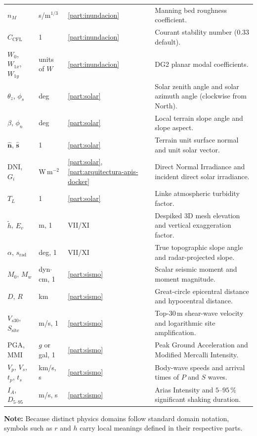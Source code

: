\documentclass[11pt,a4paper]{article}
\newcommand{\unit}[1]{\mathrm{#1}}
\begin{document}
\begin{longtable}{p{.16\linewidth}p{.11\linewidth}p{.16\linewidth}p{.45\linewidth}}
$n_M$ & s/m$^{1/3}$ & \ref{part:inundacion} & Manning bed roughness coefficient.\\
$C_{\mathrm{CFL}}$ & 1 & \ref{part:inundacion} & Courant stability number ($0.33$ default).\\
$W_0$, $W_{1x}$, $W_{1y}$ & units of $W$ & \ref{part:inundacion} & DG2 planar modal coefficients.\\
$\theta_z$, $\phi_s$ & deg & \ref{part:solar} & Solar zenith angle and solar azimuth angle (clockwise from North).\\
$\beta$, $\phi_n$ & deg & \ref{part:solar} & Local terrain slope angle and slope aspect.\\
$\hat{\mathbf{n}}$, $\hat{\mathbf{s}}$ & 1 & \ref{part:solar} & Terrain unit surface normal and unit solar vector.\\
$\mathrm{DNI}$, $G_i$ & W\,m$^{-2}$ & \ref{part:solar}, \ref{part:arquitectura-apis-docker} & Direct Normal Irradiance and incident direct solar irradiance.\\
$T_L$ & 1 & \ref{part:solar} & Linke atmospheric turbidity factor.\\
$\tilde{h}$, $E_v$ & m, 1 & VII/XI & Despiked 3D mesh elevation and vertical exaggeration factor.\\
$\alpha$, $s_{\mathrm{rad}}$ & deg, 1 & VII/XI & True topographic slope angle and radar-projected slope.\\
$M_0$, $M_w$ & dyn$\cdot$cm, 1 & \ref{part:sismo} & Scalar seismic moment and moment magnitude.\\
$D$, $R$ & km & \ref{part:sismo} & Great-circle epicentral distance and hypocentral distance.\\
$V_{s30}$, $S_{\mathrm{site}}$ & m/s, 1 & \ref{part:sismo} & Top-$30\,\unit{m}$ shear-wave velocity and logarithmic site amplification.\\
$\mathrm{PGA}$, $\mathrm{MMI}$ & $g$ or gal, 1 & \ref{part:sismo} & Peak Ground Acceleration and Modified Mercalli Intensity.\\
$V_p$, $V_s$, $t_p$, $t_s$ & km/s, s & \ref{part:sismo} & Body-wave speeds and arrival times of $P$ and $S$ waves.\\
$I_A$, $D_{5\text{--}95}$ & m/s, s & \ref{part:sismo} & Arias Intensity and $5\text{--}95\,\text{\%}$ significant shaking duration.\\\bottomrule
\end{longtable}

\noindent\textbf{Note:} Because distinct physics domains follow standard domain notation, symbols such as $r$ and $h$ carry local meanings defined in their respective parts.
\end{document}
